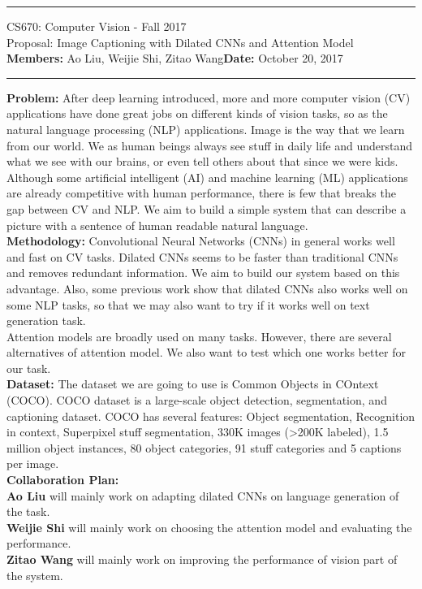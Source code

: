 \documentclass[11pt]{article}
\begin{document}
{\centering
  \rule{6.3in}{2pt}
  \vspace{0.1em}
  {\Large
    CS670: Computer Vision - Fall 2017 \\
    Proposal: Image Captioning with Dilated CNNs and Attention Model\\
  }
  \vspace{0.1em}
  \textbf{Members:} Ao Liu, Weijie Shi, Zitao Wang\hspace{20pt}\textbf{Date:} October 20, 2017\\
  \vspace{0.1em}
  \rule{6.3in}{1.5pt}
}
\vspace{0.1pc}

\textbf{Problem: }After deep learning introduced, more and more computer vision (CV) applications have done great jobs on different kinds of vision tasks, so as the natural language processing (NLP) applications. Image is the way that we learn from our world. We as human beings always see stuff in daily life and understand what we see with our brains, or even tell others about that since we were kids. Although some artificial intelligent (AI) and machine learning (ML) applications are already competitive with human performance, there is few that breaks the gap between CV and NLP. We aim to build a simple system that can describe a picture with a sentence of human readable natural language.\\

\textbf{Methodology: }Convolutional Neural Networks (CNNs) in general works well and fast on CV tasks. Dilated CNNs seems to be faster than traditional CNNs and removes redundant information. We aim to build our system based on this advantage. Also, some previous work show that dilated CNNs also works well on some NLP tasks, so that we may also want to try if it works well on text generation task.\\
\hspace*{0.5cm}Attention models are broadly used on many tasks. However, there are several alternatives of attention model. We also want to test which one works better for our task.\\

\textbf{Dataset:} The dataset we are going to use is Common Objects in COntext (COCO). COCO dataset is a large-scale object detection, segmentation, and captioning dataset. COCO has several features: Object segmentation, Recognition in context, Superpixel stuff segmentation, 330K images (>200K labeled), 1.5 million object instances, 80 object categories, 91 stuff categories and 5 captions per image.\\

\textbf{Collaboration Plan: }\\
\hspace*{0.5cm}\textbf{Ao Liu} will mainly work on adapting dilated CNNs on language generation of the task.\\
\hspace*{0.5cm}\textbf{Weijie Shi} will mainly work on choosing the attention model and evaluating the performance.\\
\hspace*{0.5cm}\textbf{Zitao Wang} will mainly work on improving the performance of vision part of the system.\\
\end{document}
